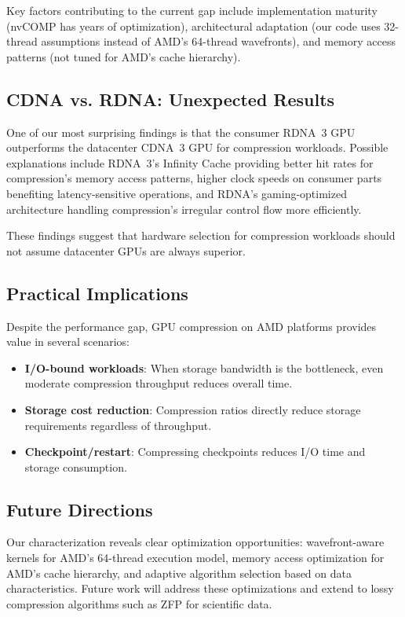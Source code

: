 \documentclass[runningheads]{llncs}
\begin{document}
Key factors contributing to the current gap include implementation maturity (nvCOMP has years of optimization), architectural adaptation (our code uses 32-thread assumptions instead of AMD's 64-thread wavefronts), and memory access patterns (not tuned for AMD's cache hierarchy).

\subsection{CDNA vs. RDNA: Unexpected Results}

One of our most surprising findings is that the consumer RDNA~3 GPU outperforms the datacenter CDNA~3 GPU for compression workloads. Possible explanations include RDNA~3's Infinity Cache providing better hit rates for compression's memory access patterns, higher clock speeds on consumer parts benefiting latency-sensitive operations, and RDNA's gaming-optimized architecture handling compression's irregular control flow more efficiently.

These findings suggest that hardware selection for compression workloads should not assume datacenter GPUs are always superior.

\subsection{Practical Implications}

Despite the performance gap, GPU compression on AMD platforms provides value in several scenarios:

\begin{itemize}
    \item \textbf{I/O-bound workloads}: When storage bandwidth is the bottleneck, even moderate compression throughput reduces overall time.
    \item \textbf{Storage cost reduction}: Compression ratios directly reduce storage requirements regardless of throughput.
    \item \textbf{Checkpoint/restart}: Compressing checkpoints reduces I/O time and storage consumption.
\end{itemize}

\subsection{Future Directions}

Our characterization reveals clear optimization opportunities: wavefront-aware kernels for AMD's 64-thread execution model, memory access optimization for AMD's cache hierarchy, and adaptive algorithm selection based on data characteristics. Future work will address these optimizations and extend to lossy compression algorithms such as ZFP for scientific data.
\end{document}
